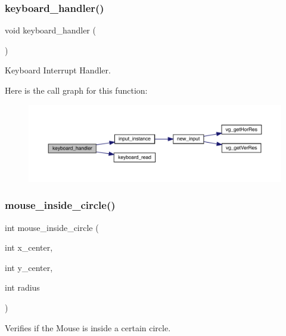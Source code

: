 \subsubsection{\texorpdfstring{keyboard\+\_\+handler()}{keyboard\_handler()}}
{\footnotesize\ttfamily void keyboard\+\_\+handler (\begin{DoxyParamCaption}{ }\end{DoxyParamCaption})}



Keyboard Interrupt Handler. 

Here is the call graph for this function\+:
\nopagebreak
\begin{figure}[H]
\begin{center}
\leavevmode
\includegraphics[width=350pt]{group___input_ga2f4098fc71cbd39422c1001d66970bf5_cgraph}
\end{center}
\end{figure}
\hypertarget{group___input_ga287741f65ec2e6257111210ed16d3d05}{}\label{group___input_ga287741f65ec2e6257111210ed16d3d05} 
\subsubsection{\texorpdfstring{mouse\+\_\+inside\+\_\+circle()}{mouse\_inside\_circle()}}
{\footnotesize\ttfamily int mouse\+\_\+inside\+\_\+circle (\begin{DoxyParamCaption}\item[{int}]{x\+\_\+center,  }\item[{int}]{y\+\_\+center,  }\item[{int}]{radius }\end{DoxyParamCaption})}



Verifies if the Mouse is inside a certain circle. 


